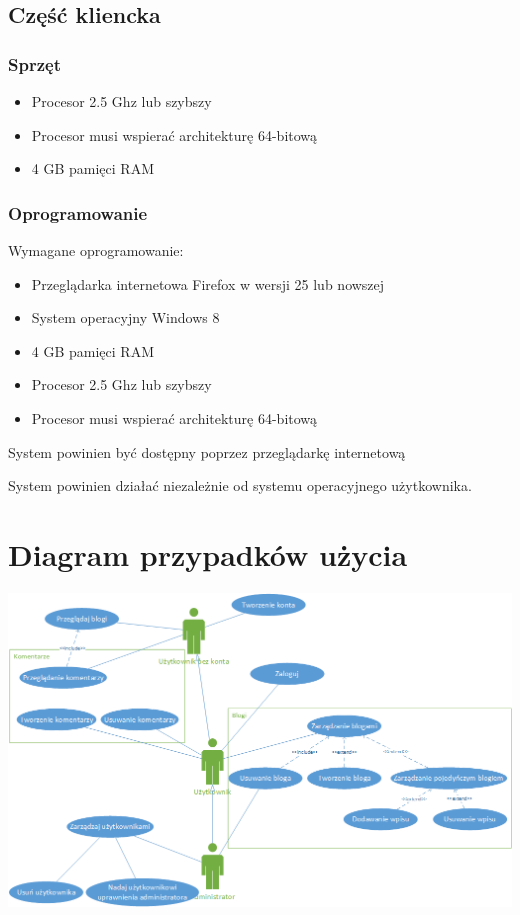 \documentclass{article}
\begin{document}
\subsection{Część kliencka}
\subsubsection{Sprzęt}
\begin{itemize}
\item Procesor 2.5 Ghz lub szybszy
\item Procesor musi wspierać architekturę 64-bitową
\item 4 GB pamięci RAM
\end{itemize}
\subsubsection{Oprogramowanie}
Wymagane oprogramowanie:
\begin{itemize}
\item Przeglądarka internetowa Firefox w wersji 25 lub nowszej
\item System operacyjny Windows 8
\item 4 GB pamięci RAM
\item Procesor 2.5 Ghz lub szybszy
\item Procesor musi wspierać architekturę 64-bitową
\end{itemize}
System powinien być dostępny poprzez przeglądarkę internetową 

System powinien działać niezależnie od systemu operacyjnego użytkownika.

\section{Diagram przypadków użycia}
\includegraphics[width=\textwidth]{UseCaseDiagram}
\end{document}
